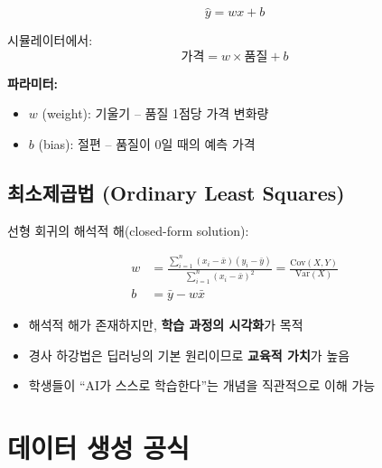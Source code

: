 \documentclass[11pt,a4paper]{article}
\begin{document}
\begin{tcolorbox}[colback=lightcyan,colframe=teal,title=\textbf{\texttwemoji{brain} 선형 회귀 모델}]
\begin{equation}
\boxed{\hat{y} = wx + b}
\end{equation}

시뮬레이터에서:
\begin{equation}
\text{가격} = w \times \text{품질} + b
\end{equation}

\textbf{파라미터:}
\begin{itemize}
    \item $w$ (weight): 기울기 -- 품질 1점당 가격 변화량
    \item $b$ (bias): 절편 -- 품질이 0일 때의 예측 가격
\end{itemize}
\end{tcolorbox}

\subsection{최소제곱법 (Ordinary Least Squares)}

선형 회귀의 해석적 해(closed-form solution):

\begin{align}
w &= \frac{\sum_{i=1}^{n}(x_i - \bar{x})(y_i - \bar{y})}{\sum_{i=1}^{n}(x_i - \bar{x})^2} = \frac{\text{Cov}(X, Y)}{\text{Var}(X)} \\[0.5em]
b &= \bar{y} - w\bar{x}
\end{align}

\begin{tcolorbox}[colback=lightyellow,colframe=orange,title=\textbf{\texttwemoji{light bulb} 시뮬레이터에서 경사 하강법을 사용하는 이유}]
\begin{itemize}
    \item 해석적 해가 존재하지만, \textbf{학습 과정의 시각화}가 목적
    \item 경사 하강법은 딥러닝의 기본 원리이므로 \textbf{교육적 가치}가 높음
    \item 학생들이 ``AI가 스스로 학습한다''는 개념을 직관적으로 이해 가능
\end{itemize}
\end{tcolorbox}

\section{ 데이터 생성 공식}
\end{document}
